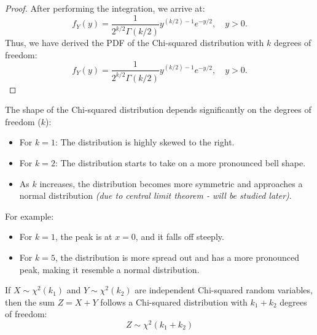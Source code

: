 \begin{proof}
After performing the integration, we arrive at:
\[
f_Y(y) = \frac{1}{2^{k/2} \Gamma(k/2)} y^{(k/2)-1} e^{-y/2}, \quad y > 0.
\]Thus, we have derived the PDF of the Chi-squared distribution with $k$ degrees of freedom:
\[
f_Y(y) = \frac{1}{2^{k/2} \Gamma(k/2)} y^{(k/2)-1} e^{-y/2}, \quad y > 0.
\]
\end{proof}

The shape of the Chi-squared distribution depends significantly on the degrees of freedom ($k$):
\begin{itemize}
    \item For $k = 1$: The distribution is highly skewed to the right.
    \item For $k = 2$: The distribution starts to take on a more pronounced bell shape.
    \item As $k$ increases, the distribution becomes more symmetric and approaches a normal distribution \textit{(due to central limit theorem - will be studied later)}.
\end{itemize}

\begin{center}
    \end{center}

    
    For example:
    \begin{itemize}
        \item For $k = 1$, the peak is at $x = 0$, and it falls off steeply.
        \item For $k = 5$, the distribution is more spread out and has a more pronounced peak, making it resemble a normal distribution.
    \end{itemize}

    If $X \sim \chi^2(k_1)$ and $Y \sim \chi^2(k_2)$ are independent Chi-squared random variables, then the sum $Z = X + Y$ follows a Chi-squared distribution with $k_1 + k_2$ degrees of freedom:
\[
Z \sim \chi^2(k_1 + k_2)
\]

